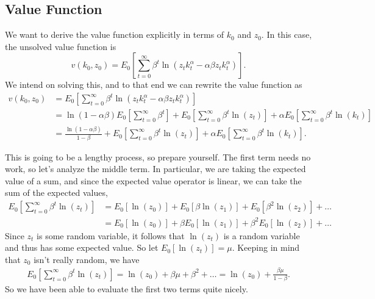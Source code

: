 \documentclass[12pt]{article}
\theoremstyle{definition}
\begin{document}
\subsection{Value Function}

We want to derive the value function explicitly in terms of $k_0$ and $z_0$. In this case, the unsolved value function is 
	\[ 
		v(k_0, z_0) = E_0 \left[ \sum_{t=0}^{\infty} \beta^t \ln( z_tk_t^{\alpha} - \alpha \beta z_t k_t^{\alpha}) \right]	.
	\]
We intend on solving this, and to that end we can rewrite the value function as 	
\begin{align*}
	v(k_0, z_0) &= E_0 \left[ \sum_{t=0}^{\infty} \beta^t \ln( z_tk_t^{\alpha} - \alpha \beta z_t k_t^{\alpha}) \right]	 \\
		&=\ln( 1 - \alpha \beta )E_0 \left[ \sum_{t=0}^{\infty} \beta^t \right]+ E_0 \left[  \sum_{t=0}^{\infty} \beta^t\ln(z_t) \right] + \alpha E_0 \left[ \sum_{t=0}^{\infty} \beta^t \ln(k_t) \right]	 \\
	&=\frac{\ln( 1 - \alpha \beta )}{1 - \beta}+ E_0 \left[  \sum_{t=0}^{\infty} \beta^t\ln(z_t) \right] + \alpha E_0 \left[ \sum_{t=0}^{\infty} \beta^t \ln(k_t) \right].
\end{align*}

This is going to be a lengthy process, so prepare yourself. The first term needs no work, so let's analyze the middle term. In particular, we are taking the expected value of a sum, and since the expected value operator is linear, we can take the sum of the expected values,
\begin{align*}
	E_0 \left[  \sum_{t=0}^{\infty} \beta^t\ln(z_t) \right]  & = E_0[\ln(z_0)] + E_0[\beta \ln(z_1)] + E_0[\beta^2 \ln(z_2)]  + \hdots	\\
	& = E_0[\ln(z_0)] + \beta E_0[\ln(z_1)] + \beta^2E_0[ \ln(z_2)]  + \hdots
\end{align*}
Since $z_t$ is some random variable, it follows that $\ln(z_t)$ is a random variable and thus has some expected value. So let $E_0[\ln(z_t)] = \mu$. Keeping in mind that $z_0$ isn't really random, we have
\begin{align*}
	E_0 \left[  \sum_{t=0}^{\infty} \beta^t\ln(z_t) \right]  = \ln(z_0) +  \beta \mu + \beta^2 +  \hdots = \ln(z_0) + \frac{\beta \mu}{1 - \beta}.
\end{align*}
So we have been able to evaluate the first two terms quite nicely.
\end{document}

